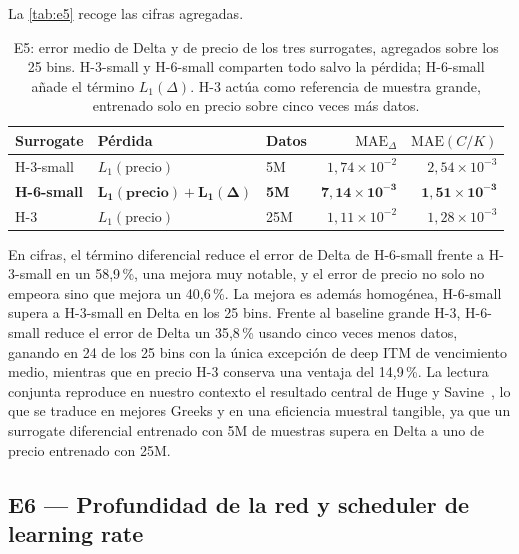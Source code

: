 \documentclass[11pt,a4paper]{article}
\begin{document}
La \autoref{tab:e5} recoge las cifras agregadas.

\begin{table}[H]
\centering
\small
\renewcommand{\arraystretch}{1.2}
\begin{tabular}{l l l r r}
\toprule
Surrogate & Pérdida & Datos & $\text{MAE}_\Delta$ & $\text{MAE}(C/K)$ \\
\midrule
H-3-small & $L_1(\text{precio})$ & 5M & $1{,}74\times 10^{-2}$ & $2{,}54\times 10^{-3}$ \\
\textbf{H-6-small} & $\boldsymbol{L_1(\text{precio}) + L_1(\Delta)}$ & \textbf{5M} & $\mathbf{7{,}14\times 10^{-3}}$ & $\mathbf{1{,}51\times 10^{-3}}$ \\
H-3 & $L_1(\text{precio})$ & 25M & $1{,}11\times 10^{-2}$ & $1{,}28\times 10^{-3}$ \\
\bottomrule
\end{tabular}
\caption{E5: error medio de Delta y de precio de los tres surrogates, agregados sobre los 25 bins. H-3-small y H-6-small comparten todo salvo la pérdida; H-6-small añade el término $L_1(\Delta)$. H-3 actúa como referencia de muestra grande, entrenado solo en precio sobre cinco veces más datos.}
\label{tab:e5}
\end{table}

En cifras, el término diferencial reduce el error de Delta de H-6-small frente a H-3-small en un 58,9\,\%, una mejora muy notable, y el error de precio no solo no empeora sino que mejora un 40,6\,\%. La mejora es además homogénea, H-6-small supera a H-3-small en Delta en los 25 bins. Frente al baseline grande H-3, H-6-small reduce el error de Delta un 35,8\,\% usando cinco veces menos datos, ganando en 24 de los 25 bins con la única excepción de deep ITM de vencimiento medio, mientras que en precio H-3 conserva una ventaja del 14,9\,\%. La lectura conjunta reproduce en nuestro contexto el resultado central de Huge y Savine~\cite{huge2020}, lo que se traduce en mejores Greeks y en una eficiencia muestral tangible, ya que un surrogate diferencial entrenado con 5M de muestras supera en Delta a uno de precio entrenado con 25M.

\subsection{E6 --- Profundidad de la red y scheduler de learning rate}\label{sec:res-e6}
\end{document}
